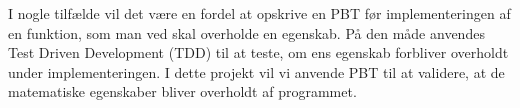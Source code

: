 I nogle tilfælde vil det være en fordel at opskrive en PBT før implementeringen af en funktion, som man ved skal overholde en egenskab. På den måde anvendes Test Driven Development (TDD) til at teste, om ens egenskab forbliver overholdt under implementeringen. I dette projekt vil vi anvende PBT til at validere, at de matematiske egenskaber bliver overholdt af programmet.
